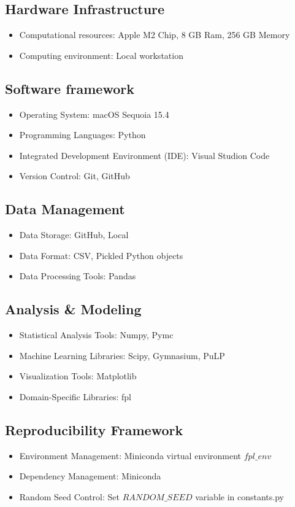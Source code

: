 \subsection{Hardware Infrastructure}

\begin{itemize}
    \item Computational resources: Apple M2 Chip, 8 GB Ram, 256 GB Memory
    \item Computing environment: Local workstation
\end{itemize}

\subsection{Software framework}
\begin{itemize}
    \item Operating System: macOS Sequoia 15.4
    \item Programming Languages: Python
    \item Integrated Development Environment (IDE): Visual Studion Code
    \item Version Control: Git, GitHub
\end{itemize}

\subsection{Data Management}
\begin{itemize}
    \item Data Storage: GitHub, Local
    \item Data Format: CSV, Pickled Python objects
    \item Data Processing Tools: Pandas
\end{itemize}

\subsection{Analysis \& Modeling}
\begin{itemize}
    \item Statistical Analysis Tools: Numpy, Pymc
    \item Machine Learning Libraries: Scipy, Gymnasium, PuLP
    \item Visualization Tools: Matplotlib
    \item Domain-Specific Libraries: fpl \cite{macLeod2019}
\end{itemize}

\subsection{Reproducibility Framework}
\begin{itemize}
    \item Environment Management: Miniconda virtual environment $fpl\_env$
    \item Dependency Management: Miniconda 
    \item Random Seed Control: Set $RANDOM\_ SEED$ variable in constants.py
\end{itemize}

